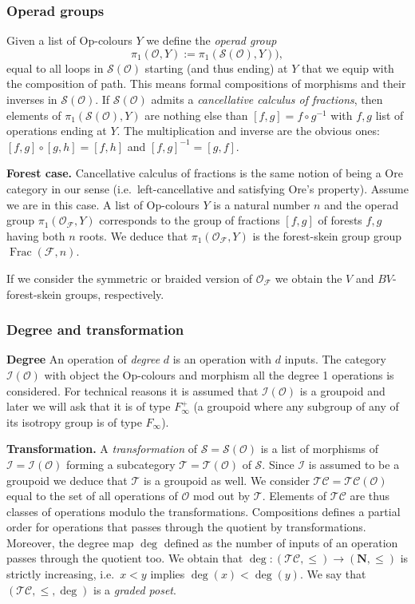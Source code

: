 \documentclass[a4paper, 12pt]{amsart}
\numberwithin{equation}{section}
\theoremstyle{definition}
\newcommand{\cC}{\mathcal C}
\newcommand{\cF}{\mathcal F}
\DeclareMathOperator{\Frac}{Frac}
\newcommand{\cI}{\mathcal I}
\newcommand{\N}{\mathbf{N}}
\newcommand{\cO}{\mathcal O}
\newcommand{\cS}{\mathcal{S}}
\newcommand{\cT}{\mathcal T}
\begin{document}
\subsubsection{Operad groups}
Given a list of Op-colours $Y$ we define the {\it operad group}
$$\pi_1(\cO,Y):=\pi_1(\cS(\cO),Y)),$$
equal to all loops in $\cS(\cO)$ starting (and thus ending) at $Y$ that we equip with the composition of path.
This means formal compositions of morphisms and their inverses in $\cS(\cO)$. 
If $\cS(\cO)$ admits a {\it cancellative calculus of fractions}, then elements of $\pi_1(\cS(\cO),Y)$ are nothing else than $[f,g]=f\circ g^{-1}$ with $f,g$ list of operations ending at $Y$. 
The multiplication and inverse are the obvious ones: $[f,g]\circ [g,h]=[f,h]$ and $[f,g]^{-1}=[g,f].$

{\bf Forest case.} 
Cancellative calculus of fractions is the same notion of being a Ore category in our sense (i.e.~left-cancellative and satisfying Ore's property).
Assume we are in this case.
A list of Op-colours $Y$ is a natural number $n$ and the operad group $\pi_1(\cO_\cF,Y)$ corresponds to the group of fractions $[f,g]$ of forests $f,g$ having both $n$ roots.
We deduce that $\pi_1(\cO_\cF,Y)$ is the forest-skein group group $\Frac(\cF,n)$.

If we consider the symmetric or braided version of $\cO_\cF$ we obtain the $V$ and $BV$-forest-skein groups, respectively.

\subsubsection{Degree and transformation}

{\bf Degree}
An operation of {\it degree} $d$ is an operation with $d$ inputs.
The category $\cI(\cO)$ with object the Op-colours and morphism all the degree 1 operations is considered. 
For technical reasons it is assumed that $\cI(\cO)$ is a groupoid and later we will ask that it is of type $F_\infty^+$ (a groupoid where any subgroup of any of its isotropy group is of type $F_\infty$).

{\bf Transformation.}
A {\it transformation} of $\cS=\cS(\cO)$ is a list of morphisms of $\cI=\cI(\cO)$ forming a subcategory $\cT=\cT(\cO)$ of $\cS$. 
Since $\cI$ is assumed to be a groupoid we deduce that $\cT$ is a groupoid as well.
We consider $\cT\cC=\cT\cC(\cO)$ equal to the set of all operations of $\cO$ mod out by $\cT.$
Elements of $\cT\cC$ are thus classes of operations modulo the transformations.
Compositions defines a partial order for operations that passes through the quotient by transformations.
Moreover, the degree map $\deg$ defined as the number of inputs of an operation passes through the quotient too.
We obtain that $\deg:(\cT\cC,\leq)\to (\N,\leq)$ is strictly increasing, i.e.~$x<y$ implies $\deg(x)<\deg(y).$
We say that $(\cT\cC,\leq,\deg)$ is a {\it graded poset}.
\end{document}
